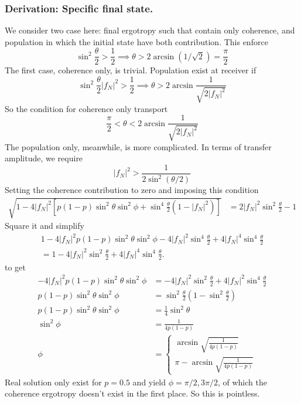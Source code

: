 \documentclass[../../../main.tex]{subfiles}
\begin{document}
\subsubsection{Derivation: Specific final state.}
We consider two case here: final ergotropy such that contain only coherence, and population in which the initial state have both contribution.
This enforce
\begin{equation*}
  \sin ^2 \frac{\theta }{2 }>\frac{1 }{2} \implies \theta>2 \arcsin (1/\sqrt{2}) = \frac{\pi }{2}
\end{equation*}
The first case, coherence only, is trivial.
Population exist at receiver if
\begin{equation*}
  \sin ^2 \frac{\theta }{2 }|f_N|^2>\frac{1 }{2} \implies \theta>2 \arcsin \frac{1 }{\sqrt{2|f_N|^2}}
\end{equation*}
So the condition for coherence only transport
\begin{equation*}
  \frac{\pi }{2 }<\theta<2 \arcsin \frac{1 }{\sqrt{2|f_N|^2}}
\end{equation*}
The population only, meanwhile, is more complicated.
In terms of transfer amplitude, we require
\begin{equation*}
  |f_N|^2>\frac{1}{2\sin^2(\theta/2)}
\end{equation*}
Setting the coherence contribution to zero and imposing this condition
\begin{align*}
  \sqrt{1-4 |f_N|^2\left[p(1-p)\sin ^2\theta \sin^2\phi+\sin ^4\frac{\theta}{2}(1-|f_N|^2)\right]}
   & =
  2|f_N|^2\sin^2\frac{\theta}{2}-1
\end{align*}
Square it and simplify
\begin{multline*}
  1
  -4|f_N|^2p(1-p)\sin^2\theta\sin^2\phi
  -4|f_N|^2\sin^4\frac{\theta}{2}
  +4|f_N|^4\sin^4\frac{\theta}{2}
  \\
  =
  1
  -4|f_N|^2\sin^2\frac{\theta}{2}
  +4|f_N|^4\sin^4\frac{\theta}{2}.
\end{multline*}
to get
\begin{align*}
  -4|f_N|^2p(1-p)\sin^2\theta\sin^2\phi
       & = -4|f_N|^2\sin^2\frac{\theta}{2}+4|f_N|^2\sin^4\frac{\theta}{2}                      \\
  p(1-p)\sin^2\theta\sin^2\phi
       & = \sin^2\frac{\theta}{2}\left( 1- \sin ^2 \frac{\theta }{2} \right)                   \\
  p(1-p)\sin^2\theta\sin^2\phi
       & =  \frac{1 }{4 }\sin^2\theta                                                          \\
  \sin^2\phi
       & = \frac{1}{4p(1-p)}                                                                   \\
  \phi & = \begin{cases}
             \arcsin\sqrt{\frac{1}{4p(1-p)}} \\ \pi - \arcsin\sqrt{\frac{1}{4p(1-p)}}
           \end{cases}
\end{align*}
Real solution only exist for $p=0.5$ and yield $\phi=\pi/2,3\pi/2$, of which the coherence ergotropy doesn't exist in the first place.
So this is pointless.
\end{document}

